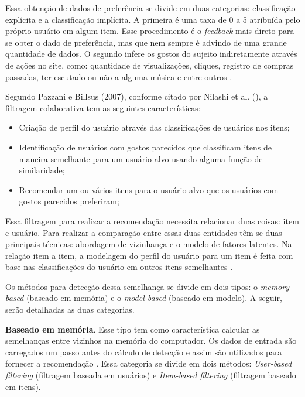 Essa obtenção de dados de preferência se divide em duas categorias: classificação explícita e a classificação implícita. A primeira é uma taxa de 0 a 5 atribuída pelo próprio usuário em algum item. Esse procedimento é o \textit{feedback} mais direto para se obter o dado de preferência, mas que nem sempre é advindo de uma grande quantidade de dados. O segundo infere os gostos do sujeito indiretamente através de ações no site, como: quantidade de visualizações, cliques, registro de compras passadas, ter escutado ou não a alguma música e entre outros \cite{luo:2018}.
	
Segundo Pazzani e Billsus (2007), conforme citado por Nilashi et al. (\citeyear{Nilashi:2013}), a filtragem colaborativa tem as seguintes características:

\begin{itemize}
    \item Criação de perfil do usuário através das classificações de usuários nos itens;
    \item Identificação de usuários com gostos parecidos que classificam itens de maneira semelhante para um usuário alvo usando alguma função de similaridade;
    \item Recomendar um ou vários itens para o usuário alvo que os usuários com gostos parecidos preferiram;

\end{itemize}

Essa filtragem para realizar a recomendação necessita relacionar duas coisas: item e usuário. Para realizar a comparação entre essas duas entidades têm se duas principais técnicas: abordagem de vizinhança e o modelo de fatores latentes. Na relação item a item, a modelagem do perfil do usuário para um item é feita com base nas classificações do usuário em outros itens semelhantes \cite{Koren:2015}.

Os métodos para detecção dessa semelhança se divide em dois tipos: o \textit{memory-based} (baseado em memória) e o \textit{model-based} (baseado em modelo). A seguir, serão detalhadas as duas categorias.


\textbf{Baseado em memória}. Esse tipo tem como característica calcular as semelhanças entre vizinhos na memória do computador. Os dados de entrada são carregados um passo antes do cálculo de detecção e assim são utilizados para fornecer a recomendação \cite{Levinas2014AnAO}. Essa categoria se divide em dois métodos: \textit{User-based filtering} (filtragem baseada em usuários) e \textit{Item-based filtering} (filtragem baseado em itens).

